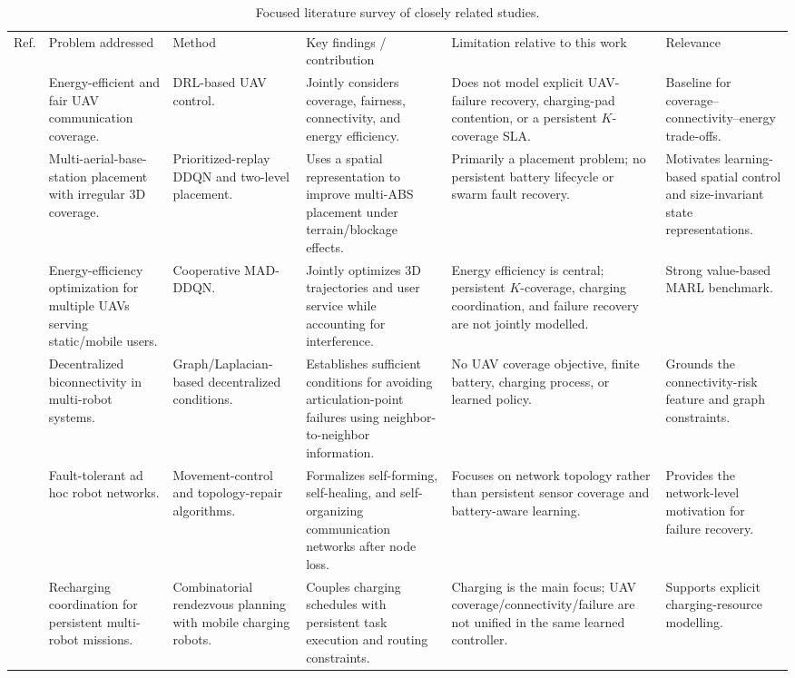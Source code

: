 \documentclass[conference]{IEEEtran}
\begin{document}
\begin{table}[t]
\caption{Focused literature survey of closely related studies.}
\label{tab:survey}
\centering
\scriptsize
\setlength{\tabcolsep}{3pt}
\renewcommand{\arraystretch}{1.08}
\begin{tabularx}{\textwidth}{@{}L{0.5cm}L{2.5cm}L{1.9cm}L{4.6cm}L{4.0cm}Y@{}}
\toprule
Ref. & Problem addressed & Method & Key findings / contribution & Limitation relative to this work & Relevance \\
\cite{liu2018} & Energy-efficient and fair UAV communication coverage. & DRL-based UAV control. & Jointly considers coverage, fairness, connectivity, and energy efficiency. & Does not model explicit UAV-failure recovery, charging-pad contention, or a persistent $K$-coverage SLA. & Baseline for coverage--connectivity--energy trade-offs. \\
\cite{qiu2019} & Multi-aerial-base-station placement with irregular 3D coverage. & Prioritized-replay DDQN and two-level placement. & Uses a spatial representation to improve multi-ABS placement under terrain/blockage effects. & Primarily a placement problem; no persistent battery lifecycle or swarm fault recovery. & Motivates learning-based spatial control and size-invariant state representations. \\
\cite{omoniwa2022} & Energy-efficiency optimization for multiple UAVs serving static/mobile users. & Cooperative MAD-DDQN. & Jointly optimizes 3D trajectories and user service while accounting for interference. & Energy efficiency is central; persistent $K$-coverage, charging coordination, and failure recovery are not jointly modelled. & Strong value-based MARL benchmark. \\
\cite{zareh2016} & Decentralized biconnectivity in multi-robot systems. & Graph/Laplacian-based decentralized conditions. & Establishes sufficient conditions for avoiding articulation-point failures using neighbor-to-neighbor information. & No UAV coverage objective, finite battery, charging process, or learned policy. & Grounds the connectivity-risk feature and graph constraints. \\
\cite{basu2004} & Fault-tolerant ad hoc robot networks. & Movement-control and topology-repair algorithms. & Formalizes self-forming, self-healing, and self-organizing communication networks after node loss. & Focuses on network topology rather than persistent sensor coverage and battery-aware learning. & Provides the network-level motivation for failure recovery. \\
\cite{mathew2015} & Recharging coordination for persistent multi-robot missions. & Combinatorial rendezvous planning with mobile charging robots. & Couples charging schedules with persistent task execution and routing constraints. & Charging is the main focus; UAV coverage/connectivity/failure are not unified in the same learned controller. & Supports explicit charging-resource modelling. \\

\end{tabularx}
\end{table}
\end{document}
